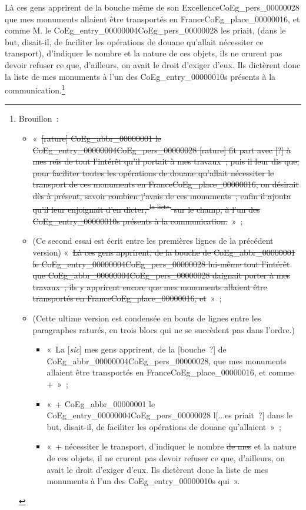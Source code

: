 \documentclass{book}
\begin{document}
\indent Là ces gens apprirent de la bouche même de son Excellence\gls{CoEg_pers_00000028} que mes monuments allaient être transportés en France\gls{CoEg_place_00000016}, et comme M. le \Gls{CoEg_entry_00000004}\gls{CoEg_pers_00000028} les priait, (dans le but, disait-il, de faciliter les opérations de douane qu’allait nécessiter ce transport), d’indiquer le nombre et la nature de ces objets, ils ne crurent pas devoir refuser ce que, d’ailleurs, on avait le droit d’exiger d’eux. Ils dictèrent donc la liste de mes monuments à l’un des \glspl{CoEg_entry_00000010} présents à la communication.\footnote{Brouillon~:
\begin{itemize}
\item «~\sout{[rature] \gls{CoEg_abbr_00000001} le \Gls{CoEg_entry_00000004}\gls{CoEg_pers_00000028} [rature] fit part avec [?] à mes reïs de tout l’intérêt qu’il portait à mes travaux~; puis il leur dis que, pour faciliter toutes les opérations de douane qu’allait nécessiter le transport de ces monuments en France\gls{CoEg_place_00000016}, on désirait dès à présent, savoir combien j’avais de ces monuments~; enfin il ajouta qu’il leur enjoignait d’en dicter, \textsuperscript{la liste,} sur le champ, à l’un des \glspl{CoEg_entry_00000010} présents à la communication.}~»~;
\item (Ce second essai est écrit entre les premières lignes de la précédent version) «~\sout{Là ces gens apprirent, de la bouche de \gls{CoEg_abbr_00000001} le \Gls{CoEg_entry_00000004}\gls{CoEg_pers_00000028} lui-même tout l’intérêt que \gls{CoEg_abbr_00000004}\gls{CoEg_pers_00000028} daignait porter à mes travaux~; ils y apprirent encore que mes monuments allaient être transportés en France\gls{CoEg_place_00000016}, et}~»~;
\item (Cette ultime version est condensée en bouts de lignes entre les paragraphes raturés, en trois blocs qui ne se succèdent pas dans l’ordre.)
\begin{itemize}
\item «~La [\textit{sic}] mes gens apprirent, de la [bouche~?] de \gls{CoEg_abbr_00000004}\gls{CoEg_pers_00000028}, que mes monuments allaient être transportés en France\gls{CoEg_place_00000016}, et comme +~»~;
\item «~+ \gls{CoEg_abbr_00000001} le \Gls{CoEg_entry_00000004}\gls{CoEg_pers_00000028} l[...es priait~?] dans le but, disait-il, de faciliter les opérations de douane qu’allaient~»~;
\item  «~+ nécessiter le transport, d’indiquer le nombre \sout{de mes} et la nature de ces objets, il ne crurent pas devoir refuser ce que, d’ailleurs, on avait le droit d’exiger d’eux. Ils dictèrent donc la liste de mes monuments à l’un des \glspl{CoEg_entry_00000010} qui~».
\end{itemize}
\end{itemize}
}\\
\end{document}
